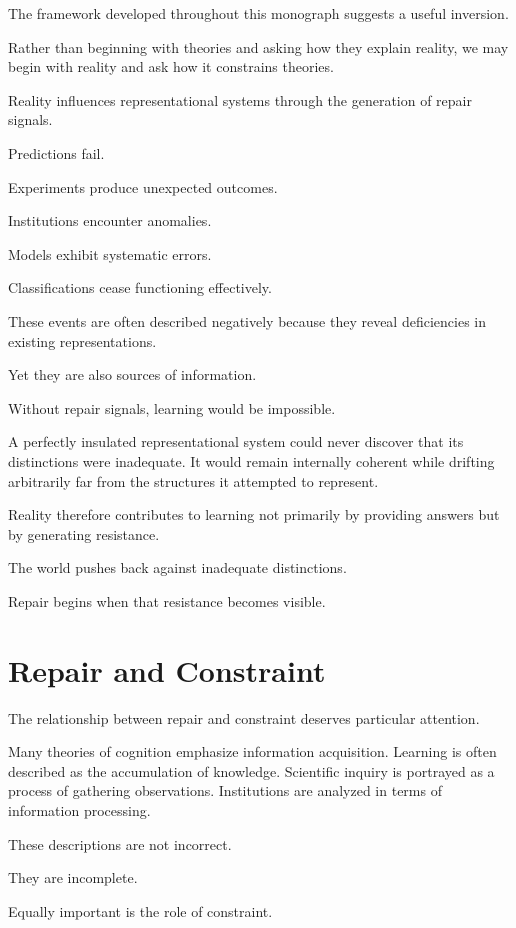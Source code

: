 \documentclass[11pt,oneside,openany]{book}
\begin{document}
The framework developed throughout this monograph suggests a useful inversion.

Rather than beginning with theories and asking how they explain reality, we may begin with reality and ask how it constrains theories.

Reality influences representational systems through the generation of repair signals.

Predictions fail.

Experiments produce unexpected outcomes.

Institutions encounter anomalies.

Models exhibit systematic errors.

Classifications cease functioning effectively.

These events are often described negatively because they reveal deficiencies in existing representations.

Yet they are also sources of information.

Without repair signals, learning would be impossible.

A perfectly insulated representational system could never discover that its distinctions were inadequate. It would remain internally coherent while drifting arbitrarily far from the structures it attempted to represent.

Reality therefore contributes to learning not primarily by providing answers but by generating resistance.

The world pushes back against inadequate distinctions.

Repair begins when that resistance becomes visible.

\section{Repair and Constraint}

The relationship between repair and constraint deserves particular attention.

Many theories of cognition emphasize information acquisition. Learning is often described as the accumulation of knowledge. Scientific inquiry is portrayed as a process of gathering observations. Institutions are analyzed in terms of information processing.

These descriptions are not incorrect.

They are incomplete.

Equally important is the role of constraint.
\end{document}
